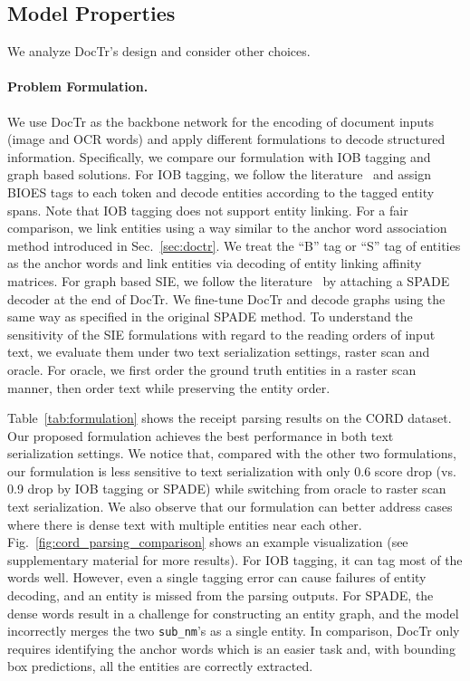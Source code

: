 \subsection{Model Properties} \label{sec:alation_study}
We analyze DocTr's design and consider other choices.
\vspace{-1em}
\paragraph{Problem Formulation.} We use DocTr as the backbone network for the encoding of document inputs (image and OCR words) and apply different formulations to decode structured information. Specifically, we compare our formulation with IOB tagging and graph based solutions. For IOB tagging, we follow the literature~\cite{lee2022formnet,xu2020layoutlm} and assign BIOES tags to each token and decode entities according to the tagged entity spans. Note that IOB tagging does not support entity linking. For a fair comparison, we link entities using a way similar to the anchor word association method introduced in Sec.~\ref{sec:doctr}. We treat the ``B'' tag or ``S'' tag of entities as the anchor words and link entities via decoding of entity linking affinity matrices. For graph based SIE, we follow the literature~\cite{hong2021bros,hwang2020spatial} by attaching a SPADE~\cite{hwang2020spatial} decoder at the end of DocTr. We fine-tune DocTr and decode graphs using the same way as specified in the original SPADE method. To understand the sensitivity of the SIE formulations with regard to the reading orders of input text, we evaluate them under two text serialization settings, raster scan and oracle. For oracle, we first order the ground truth entities in a raster scan manner, then order text while preserving the entity order.

Table~\ref{tab:formulation} shows the receipt parsing results on the CORD dataset. Our proposed formulation achieves the best performance in both text serialization settings. We notice that, compared with the other two formulations, our formulation is less sensitive to text serialization with only 0.6 score drop (vs. 0.9 drop by IOB tagging or SPADE) while switching from oracle to raster scan text serialization. We also observe that our formulation can better address cases where there is dense text with multiple entities near each other. Fig.~\ref{fig:cord_parsing_comparison} shows an example visualization (see supplementary material for more results). For IOB tagging, it can tag most of the words well. However, even a single tagging error can cause failures of entity decoding, and an entity is missed from the parsing outputs. For SPADE, the dense words result in a challenge for constructing an entity graph, and the model incorrectly merges the two \texttt{sub\_nm}'s as a single entity. In comparison, DocTr only requires identifying the anchor words which is an easier task and, with bounding box predictions, all the entities are correctly extracted.

